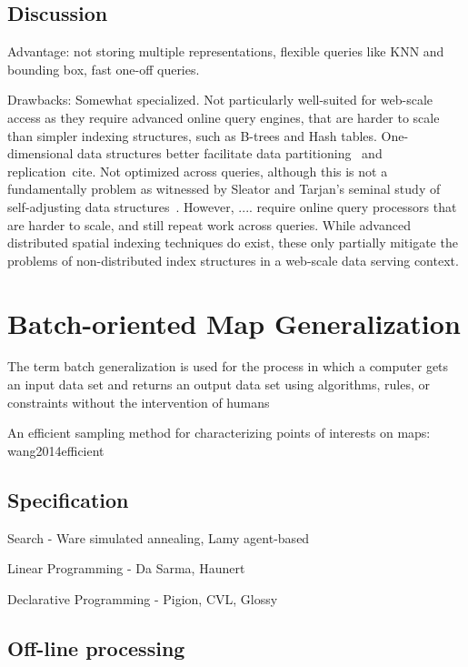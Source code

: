 \documentclass[11pt, oneside]{report}
\begin{document}
\subsection{Discussion}
Advantage: not storing multiple representations, flexible queries like KNN and bounding box, fast one-off queries.

Drawbacks: Somewhat specialized. Not particularly well-suited for web-scale access as they  require advanced online query engines, that are harder to scale than simpler indexing structures, such as B-trees and Hash tables. One-dimensional data structures better facilitate data partitioning~\cite{consistenthashing} and replication~cite{}.  Not optimized across queries, although this is not a fundamentally problem as witnessed by Sleator and Tarjan's seminal study of self-adjusting data structures~\cite{tarjan1985selfadjusting}. However, .... require online query processors that are harder to scale, and still repeat work across queries. While advanced distributed spatial indexing techniques do exist, these only partially mitigate the problems of non-distributed index structures in a web-scale data serving context.

\section{Batch-oriented Map Generalization}
The term batch generalization is used for the process in which a computer gets an input data set and returns an output data set using algorithms, rules, or constraints without the intervention of humans~\cite{lagrange1993survey}

An efficient sampling method for characterizing points of interests on maps: wang2014efficient

\subsection{Specification}

Search
- Ware simulated annealing, Lamy agent-based

Linear Programming
- Da Sarma, Haunert

Declarative Programming
- Pigion, CVL, Glossy

\subsection{Off-line processing}
\end{document}
